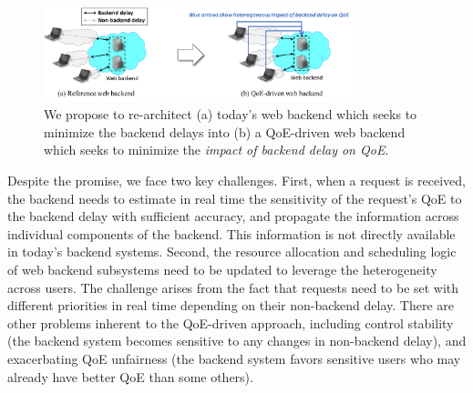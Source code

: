 \begin{figure}[t]
	\centering
	\vspace{-0.5cm}
	\includegraphics[width=0.8\textwidth]{figs/intro-overview-new.pdf}
	\vspace{-0.4cm}
	\caption{We propose to re-architect (a) today's web backend which seeks to minimize the backend delays into (b) a QoE-driven web backend which seeks to minimize the {\em impact of backend delay on QoE}.}
	\label{fig:intro-overview}
\end{figure}





Despite the promise, we face two key challenges.
First, when a request is received, the backend needs to estimate in real time the sensitivity of the request's QoE to the backend delay with sufficient accuracy, and propagate the information across individual components of the backend. This information is not directly available in today's backend systems.
Second, the resource allocation and scheduling logic of web backend subsystems need to be updated to leverage the heterogeneity across users. The challenge arises from the fact that requests need to be set with different priorities in real time depending on their non-backend delay.
There are other problems inherent to the QoE-driven approach, including control stability (\ie the backend system becomes sensitive to any changes in non-backend delay), and exacerbating QoE unfairness (\ie the backend system favors sensitive users who may already have better QoE than some others).

